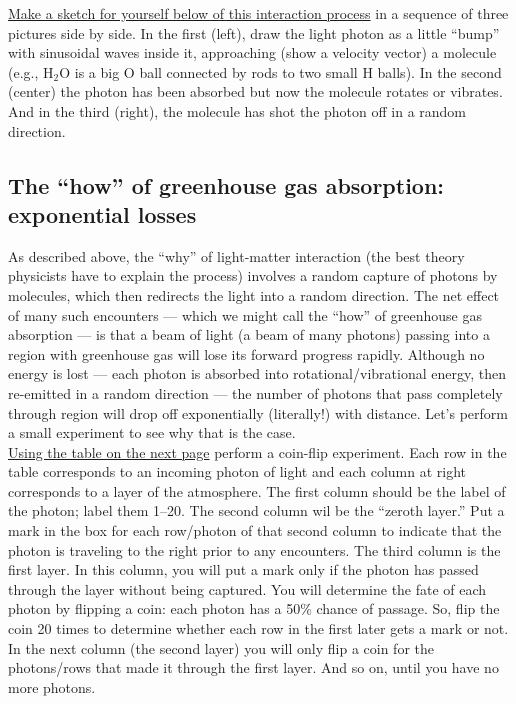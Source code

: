 \noindent \underline{Make a sketch for yourself below of this interaction process} in a sequence of three pictures side by side.  In the first (left), draw the light photon as a little ``bump'' with sinusoidal waves inside it, approaching (show a velocity vector) a molecule (e.g., $\text{H}_2\text{O}$ is a big O ball connected by rods to two small H balls).  In the second (center) the photon has been absorbed but now the molecule rotates or vibrates. And in the third (right), the molecule has shot the photon off in a random direction.

\vspace{4cm}

\subsection{The ``how'' of greenhouse gas absorption: exponential losses}

As described above, the ``why'' of light-matter interaction (the best theory physicists have to explain the process) involves a random capture of photons by molecules, which then redirects the light into a random direction.  The net effect of many such encounters --- which we might call the ``how'' of greenhouse gas absorption --- is that a beam of light (a beam of many photons) passing into a region with greenhouse gas will lose its forward progress rapidly.  Although no energy is lost --- each photon is absorbed into rotational/vibrational energy, then re-emitted in a random direction --- the number of photons that pass completely through region will drop off exponentially (literally!) with distance.  Let's perform a small experiment to see why that is the case.\\[-6pt]

\noindent \underline{Using the table on the next page} perform a coin-flip experiment.  Each row in the table corresponds to an incoming photon of light and each column at right corresponds to a layer of the atmosphere.  The first column should be the label of the photon; label them 1--20. The second column wil be the ``zeroth layer.'' Put a mark in the box for each row/photon of that second column to indicate that the photon is traveling to the right prior to any encounters. The third column is the first layer.  In this column, you will put a mark only if the photon has passed through the layer without being captured.  You will determine the fate of each photon by flipping a coin: each photon has a 50\% chance of passage.  So, flip the coin 20 times to determine whether each row in the first later gets a mark or not.  In the next column (the second layer) you will only flip a coin for the photons/rows that made it through the first layer.  And so on, until you have no more photons.  \\[-6pt]


